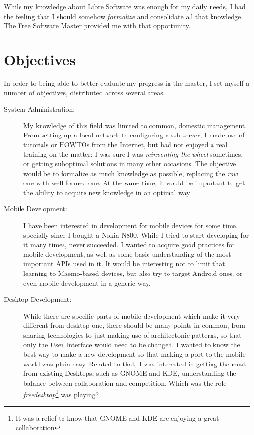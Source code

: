 While my knowledge about Libre Software was enough for my daily needs, I had the feeling
that I should somehow {\it formalize} and consolidate all that knowledge. The Free Software
Master provided me with that opportunity.

\section{Objectives}

In order to being able to better evaluate my progress in the master, I set myself a
number of objectives, distributed across several areas.

\begin{description}
\item[System Administration:] My knowledge of this field was limited to common, domestic management.
From setting up a local network to configuring a ssh server, I made use of tutorials or HOWTOs
from the Internet, but had not enjoyed a real training on the matter: I was sure I was {\it
reinventing the wheel} sometimes, or getting suboptimal solutions in many other occasions.
The objective would be to formalize as much knowledge as possible, replacing the {\it raw} one
with well formed one. At the same time, it would be important to get the ability to
acquire new knowledge in an optimal way.

\item[Mobile Development:] I have been interested in development for mobile devices for
some time, specially since I bought a Nokia N800. While I tried to start developing for
it many times, never succeeded. I wanted to acquire good practices for mobile development,
as well as some basic understanding of the most important APIs used in it. It would
be interesting not to limit that learning to Maemo-based devices, but also try to
target Android ones, or even mobile development in a generic way.

\item[Desktop Development:] While there are specific parts of mobile development which
make it very different from desktop one, there should be many points in common, from
sharing technologies to just making use of architectonic patterns, so that only the
User Interface would need to be changed. I wanted to know the best way to make a new
development so that making a port to the mobile world was plain easy. Related to that,
I was interested in getting the most from existing Desktops, such as GNOME and
KDE, understanding the balance between collaboration and competition. Which was the
role {\it freedesktop}\cite{freedesktop:home}\footnote{It was a relief to know that GNOME and KDE are
enjoying a great collaboration} was playing?


\end{description}
